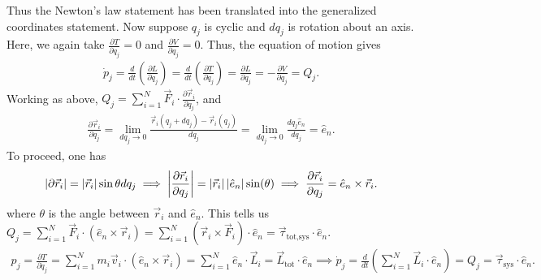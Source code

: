 Thus the Newton's law statement has been translated into the generalized coordinates statement. Now suppose $q_{j}$ is cyclic and $dq_{j}$ is rotation about an axis. Here, we again take $\frac{\partial T}{\partial q_{j}} = 0$ and $\frac{\partial V}{\partial q_{j}} = 0$. Thus, the equation of motion gives
\begin{align}
    \dot{p}_{j} = \frac{d}{dt} \left( \frac{\partial L}{\partial \dot{q}_{j}} \right) = \frac{d}{dt} \left( \frac{\partial T}{\partial \dot{q}_{j}} \right) = \frac{\partial L}{\partial q_{j}} = -\frac{\partial V}{\partial q_{j}} = Q_{j}.
\end{align}
Working as above, $Q_{j} = \sum_{i=1}^{N} \vec{F}_{i} \cdot \frac{\partial \vec{r}_{i}}{\partial q_{j}}$, and
\begin{align}
    \frac{\partial \vec{r}_{i}}{\partial q_{j}} = \lim_{dq_{j} \to 0} \frac{\vec{r}_{i} (q_{j} + dq_{j}) - \vec{r}_{i}(q_{j})}{dq_{j}} = \lim_{dq_{j} \to 0} \frac{dq_{j} \hat{e}_{n}}{dq_{j}} = \hat{e}_{n}.
\end{align}
To proceed, one has
\begin{align}
    \left| \partial \vec{r}_{i} \right| = \left| \vec{r}_{i} \right| \sin \theta dq_{j} \implies \left| \frac{\partial \vec{r}_{i}}{\partial q_{j}} \right| = \left| \vec{r}_{i} \right| \left| \hat{e}_{n} \right| \sin(\theta) \implies \frac{\partial \vec{r}_{i}}{\partial q_{j}} = \hat{e}_{n} \times \vec{r}_{i}.
\end{align}
where $\theta$ is the angle between $\vec{r}_{i}$ and $\hat{e}_{n}$. This tells us $Q_{j} = \sum_{i=1}^{N} \vec{F}_{i} \cdot (\hat{e}_{n} \times \vec{r}_{i}) = \sum_{i=1}^{N} (\vec{r}_{i} \times \vec{F}_{i}) \cdot \hat{e}_{n} = \vec{\tau}_{\text{tot,sys}} \cdot \hat{e}_{n}$.
\begin{align}
    p_{j} = \frac{\partial T}{\partial \dot{q}_{j}} = \sum_{i=1}^{N} m_{i} \vec{v}_{i} \cdot (\hat{e}_{n} \times \vec{r}_{i}) = \sum_{i=1}^{N} \hat{e}_{n} \cdot \vec{L}_{i} = \vec{L}_{\text{tot}} \cdot \hat{e}_{n} \implies \dot{p}_{j} = \frac{d}{dt} \left( \sum_{i=1}^{N} \vec{L}_{i} \cdot \hat{e}_{n} \right) = Q_{j} = \vec{\tau}_{\text{sys}} \cdot \hat{e}_{n}.
\end{align}
